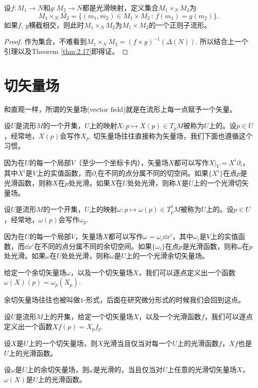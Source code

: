 \begin{pro}\label{pro:2.21}
设$f:M_1\to N$和$g:M_2\to N$都是光滑映射，定义集合$M_1\times_N M_2$为
\[
	M_1\times_N M_2=\{(m_1,m_2)\in M_1\times M_2\,:\, f(m_1)=g(m_2)\}.
\]
如果$f$, $g$横截相交，则此时$M_1\times_N M_2$为$M_1\times M_2$的一个正则子流形。
\end{pro}

\begin{proof}
作为集合，不难看到$M_1\times_N M_2=(f\times g)^{-1}(\Delta(N))$. 所以结合上一个引理以及Theorem \ref{thm:2.17}即得证。
\end{proof}

\section{切矢量场}

和直观一样，所谓的矢量场(vector field)就是在流形上每一点赋予一个矢量。

\begin{para}[切矢量场]
设$U$是流形$M$的一个开集，$U$上的映射$X:p\mapsto X(p)\in T_pM$被称为$U$上的。设$p\in U$，经常地，$X(p)$会写作$X_p$. 切矢量场往往直接称为矢量场，我们下面也遵循这个习惯。

因为在$U$的每一个局部$V$（至少一个坐标卡内），矢量场$X$都可以写作$X|_V=X^i\partial_i$，其中$X^i$是$V$上的实值函数，而$\partial_i$在不同的点分属不同的切空间。如果$\{X^i\}$在点$p$是光滑函数，则称$X$在$p$处光滑。如果$X$在$U$处处光滑，则称$X$是$U$上的一个光滑切矢量场。
\end{para}

\begin{para}[余切矢量场]
设$U$是流形$M$的一个开集，$U$上的映射$\omega:p\mapsto \omega(p)\in T^*_pM$被称为$U$上的。设$p\in U$，经常地，$\omega(p)$会写作$\omega_p$. 

因为在$U$的每一个局部$V$，矢量场$X$都可以写作$\omega=\omega_i\dd x^i$，其中$\omega_i$是$V$上的实值函数，而$\dd x^i$在不同的点分属不同的余切空间。如果$\{\omega_i\}$在点$p$是光滑函数，则称$\omega$在$p$处光滑。如果$\omega$在$U$处处光滑，则称$\omega$是$U$上的一个光滑余切矢量场。

给定一个余切矢量场$\omega$，以及一个切矢量场$X$，我们可以逐点定义出一个函数$\omega(X)(p)=\omega_p(X_p)$.
\end{para}

余切矢量场往往也被叫做$1$-形式，后面在研究微分形式的时候我们会回到这点。

\begin{pro}设$U$是流形$M$上的开集，给定一个切矢量场$X$，以及一个光滑函数$f$，我们可以逐点定义出一个函数$Xf(p)=X_pf_p$.
\begin{compactenum}
\item 设$X$是$U$上的一个切矢量场，则$X$光滑当且仅当对每一个$U$上的光滑函数$f$，$Xf$也是$U$上的光滑函数。
\item 设$\omega$是$U$上的余切矢量场，则$\omega$是光滑的，当且仅当对$U$上任意的光滑切矢量场$X$，$\omega(X)$是$U$上的光滑函数。
\end{compactenum}
\end{pro}


